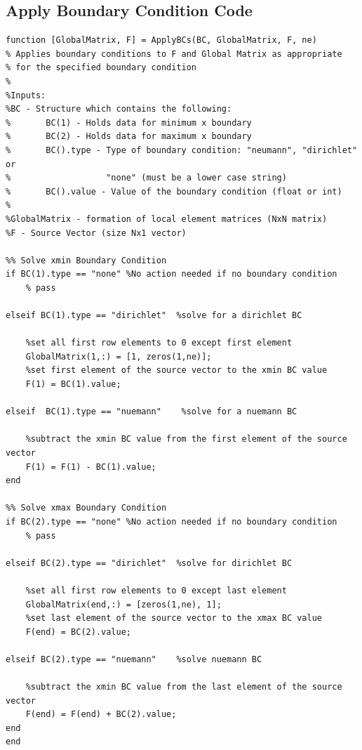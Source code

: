 \documentclass[11pt]{article}
\begin{document}
\begin{appendices}
\section{Apply Boundary Condition Code} \label{ap:BC}
\begin{lstlisting}
function [GlobalMatrix, F] = ApplyBCs(BC, GlobalMatrix, F, ne)
% Applies boundary conditions to F and Global Matrix as appropriate
% for the specified boundary condition
%
%Inputs:
%BC - Structure which contains the following:
%       BC(1) - Holds data for minimum x boundary
%       BC(2) - Holds data for maximum x boundary
%       BC().type - Type of boundary condition: "neumann", "dirichlet" or
%                   "none" (must be a lower case string)
%       BC().value - Value of the boundary condition (float or int)
%
%GlobalMatrix - formation of local element matrices (NxN matrix)
%F - Source Vector (size Nx1 vector)

%% Solve xmin Boundary Condition 
if BC(1).type == "none" %No action needed if no boundary condition
    % pass 
    
elseif BC(1).type == "dirichlet"  %solve for a dirichlet BC
    
    %set all first row elements to 0 except first element  
    GlobalMatrix(1,:) = [1, zeros(1,ne)];   
    %set first element of the source vector to the xmin BC value
    F(1) = BC(1).value;
    
elseif  BC(1).type == "nuemann"    %solve for a nuemann BC
    
    %subtract the xmin BC value from the first element of the source vector 
    F(1) = F(1) - BC(1).value;
end

%% Solve xmax Boundary Condition
if BC(2).type == "none" %No action needed if no boundary condition
    % pass
    
elseif BC(2).type == "dirichlet"  %solve for dirichlet BC
    
    %set all first row elements to 0 except last element 
    GlobalMatrix(end,:) = [zeros(1,ne), 1];
    %set last element of the source vector to the xmax BC value
    F(end) = BC(2).value;
    
elseif BC(2).type == "nuemann"    %solve nuemann BC
    
    %subtract the xmin BC value from the last element of the source vector 
    F(end) = F(end) + BC(2).value;
end   
end

\end{lstlisting}
\pagebreak




\end{appendices}
\end{document}
